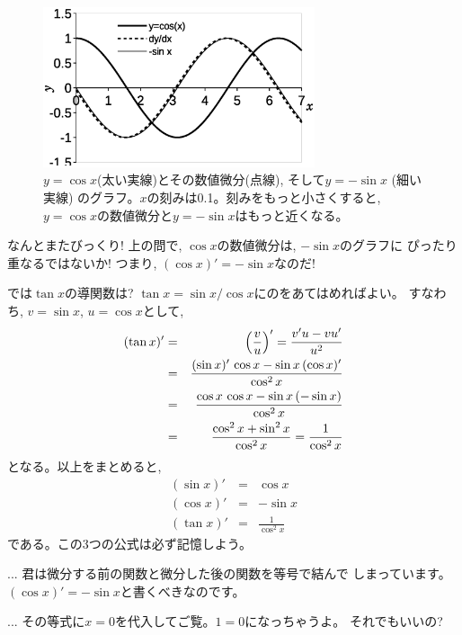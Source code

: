 \begin{figure}[h]
    \centering
    \includegraphics[width=8cm]{diffcos.eps}
    \caption{$y=\cos x$(太い実線)とその数値微分(点線), そして$y=-\sin x$ (細い実線)
のグラフ。$x$の刻みは0.1。刻みをもっと小さくすると, 
$y=\cos x$の数値微分と$y=-\sin x$はもっと近くなる。}\label{fig:diffcos}
\end{figure}

なんとまたびっくり! 上の問で, $\cos x$の数値微分は, $-\sin x$のグラフに
ぴったり重なるではないか! つまり, $(\cos x)'=-\sin x$なのだ!\mv

では$\tan x$の導関数は? $\tan x=\sin x/\cos x$にのをあてはめればよい。
すなわち, $v=\sin x$, $u=\cos x$として, 
\begin{eqnarray}
(\tan x)'&=&\Bigl(\frac{v}{u}\Bigr)'=\frac{v'u-vu'}{u^2}\nonumber\\
&=&\frac{(\sin x)'\,\cos x-\sin x\,(\cos x)'}{\cos^2x}\nonumber\\
&=&\frac{\cos x\,\cos x-\sin x\,(-\sin x)}{\cos^2x}\nonumber\\
&=&\frac{\cos^2 x+\sin^2 x}{\cos^2x}=\frac{1}{\cos^2 x}\label{eq:difftan}
\end{eqnarray}
となる。以上をまとめると, 
\begin{eqnarray}
(\sin x)'&=&\cos x\label{eq:diff_sinx}\\
(\cos x)'&=&-\sin x\label{eq:diff_cosx}\\
(\tan x)'&=&\frac{1}{\cos^2 x}\label{eq:diff_tanx}
\end{eqnarray}
である。この3つの公式は必ず記憶しよう。

\begin{faq}{\small{}
... 君は微分する前の関数と微分した後の関数を等号で結んで
しまっています。$(\cos x)'=-\sin x$と書くべきなのです。}\end{faq}

\begin{faq}{\small{}
... その等式に$x=0$を代入してご覧。$1=0$になっちゃうよ。
それでもいいの?}\end{faq}

